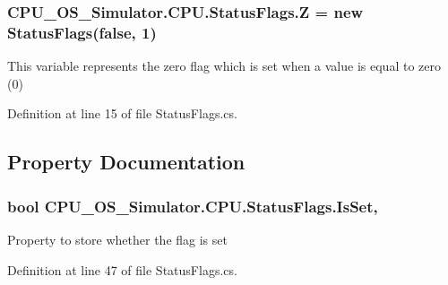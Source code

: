 \subsubsection[{Z}]{ C\+P\+U\+\_\+\+O\+S\+\_\+\+Simulator.\+C\+P\+U.\+Status\+Flags.\+Z = new {\bf Status\+Flags}(false, 1)\hspace{0.3cm}{\ttfamily [static]}}\label{class_c_p_u___o_s___simulator_1_1_c_p_u_1_1_status_flags_aa38943c12054a3f613161ecde5580f27}


This variable represents the zero flag which is set when a value is equal to zero (0) 



Definition at line 15 of file Status\+Flags.\+cs.



\subsection{Property Documentation}
\hypertarget{class_c_p_u___o_s___simulator_1_1_c_p_u_1_1_status_flags_a96ee01f7bcf0a1d0810c75705e462b43}{}
\subsubsection[{Is\+Set}]{\setlength{\rightskip}{0pt plus 5cm}bool C\+P\+U\+\_\+\+O\+S\+\_\+\+Simulator.\+C\+P\+U.\+Status\+Flags.\+Is\+Set\hspace{0.3cm}{\ttfamily [get]}, {\ttfamily [set]}}\label{class_c_p_u___o_s___simulator_1_1_c_p_u_1_1_status_flags_a96ee01f7bcf0a1d0810c75705e462b43}


Property to store whether the flag is set 



Definition at line 47 of file Status\+Flags.\+cs.

\hypertarget{class_c_p_u___o_s___simulator_1_1_c_p_u_1_1_status_flags_a2978a3bc6493134bb9546c879e625fc2}{}
